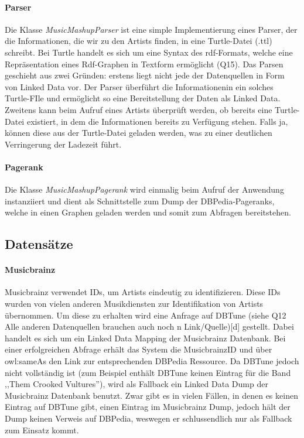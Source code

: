 \paragraph{Parser} Die Klasse \textit{MusicMashupParser} ist eine simple Implementierung eines Parser, der die Informationen, die wir zu den Artists finden, in eine Turtle-Datei (.ttl) schreibt. Bei Turtle handelt es sich um eine Syntax des rdf-Formats, welche eine Repräsentation eines Rdf-Graphen in Textform ermöglicht (Q15). Das Parsen geschieht aus zwei Gründen: erstens liegt nicht jede der Datenquellen in Form von Linked Data vor. Der Parser überführt die Informationenin ein solches Turtle-FIle und ermöglicht so eine Bereitstellung der Daten als Linked Data.  Zweitens kann beim Aufruf eines Artists überprüft werden, ob bereits eine Turtle-Datei existiert, in dem die Informationen bereits zu Verfügung stehen. Falls ja, können diese aus der Turtle-Datei geladen werden, was zu einer deutlichen Verringerung der Ladezeit führt.


\paragraph{Pagerank} Die Klasse \textit{MusicMashupPagerank} wird einmalig beim Aufruf der Anwendung instanziiert und dient als Schnittstelle zum Dump der DBPedia-Pageranks, welche in einen Graphen geladen werden und somit zum Abfragen bereitstehen.

\subsection{Datensätze}

\paragraph{Musicbrainz} Musicbrainz verwendet IDs, um Artists eindeutig zu identifizieren. Diese IDs wurden von vielen anderen Musikdiensten zur Identifikation von Artists übernommen. Um diese zu erhalten wird eine Anfrage auf DBTune (siehe Q12 Alle anderen Datenquellen brauchen auch noch n Link/Quelle)[d] gestellt. Dabei handelt es sich um ein Linked Data Mapping der Musicbrainz Datenbank. Bei einer erfolgreichen Abfrage erhält das System die MusicbrainzID und über owl:sameAs den Link zur entsprechenden DBPedia Ressource. Da DBTune jedoch nicht vollständig ist (zum Beispiel enthält DBTune keinen Eintrag für die Band ,,Them Crooked Vultures''), wird als Fallback ein Linked Data Dump der Musicbrainz Datenbank benutzt. Zwar gibt es in vielen Fällen, in denen es keinen Eintrag auf DBTune gibt, einen Eintrag im Musicbrainz Dump, jedoch hält der Dump keinen Verweis auf DBPedia, weswegen er schlussendlich nur als Fallback zum Einsatz kommt.


